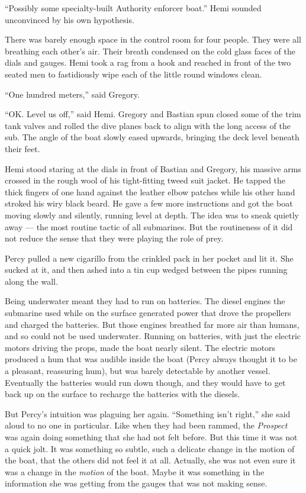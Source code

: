 \documentclass[
]{scrbook}
\begin{document}
``Possibly some specialty-built Authority enforcer boat.'' Hemi sounded
unconvinced by his own hypothesis.

There was barely enough space in the control room for four people. They
were all breathing each other's air. Their breath condensed on the cold
glass faces of the dials and gauges. Hemi took a rag from a hook and
reached in front of the two seated men to fastidiously wipe each of the
little round windows clean.

``One hundred meters,'' said Gregory.

``OK. Level us off,'' said Hemi. Gregory and Bastian spun closed some of
the trim tank valves and rolled the dive planes back to align with the
long access of the sub. The angle of the boat slowly eased upwards,
bringing the deck level beneath their feet.

Hemi stood staring at the dials in front of Bastian and Gregory, his
massive arms crossed in the rough wool of his tight-fitting tweed suit
jacket. He tapped the thick fingers of one hand against the leather
elbow patches while his other hand stroked his wiry black beard. He gave
a few more instructions and got the boat moving slowly and silently,
running level at depth. The idea was to sneak quietly away --- the most
routine tactic of all submarines. But the routineness of it did not
reduce the sense that they were playing the role of prey.

Percy pulled a new cigarillo from the crinkled pack in her pocket and
lit it. She sucked at it, and then ashed into a tin cup wedged between
the pipes running along the wall.

Being underwater meant they had to run on batteries. The diesel engines
the submarine used while on the surface generated power that drove the
propellers and charged the batteries. But those engines breathed far
more air than humans, and so could not be used underwater. Running on
batteries, with just the electric motors driving the props, made the
boat nearly silent. The electric motors produced a hum that was audible
inside the boat (Percy always thought it to be a pleasant, reassuring
hum), but was barely detectable by another vessel. Eventually the
batteries would run down though, and they would have to get back up on
the surface to recharge the batteries with the diesels.

But Percy's intuition was plaguing her again. ``Something isn't right,''
she said aloud to no one in particular. Like when they had been rammed,
the \emph{Prospect} was again doing something that she had not felt
before. But this time it was not a quick jolt. It was something so
subtle, such a delicate change in the motion of the boat, that the
others did not feel it at all. Actually, she was not even sure it was a
change in the \emph{motion} of the boat. Maybe it was something in the
information she was getting from the gauges that was not making sense.
\end{document}
